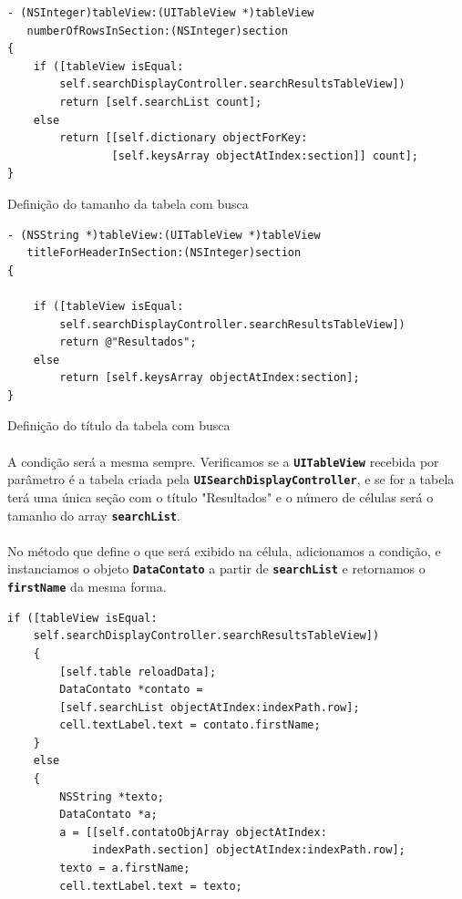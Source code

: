 \documentclass[a4paper,12pt,brazil,doubleside]{book}
\begin{document}
\begin{singlespace}
\bigskip

\begin{listing}[H]
\begin{verbatim}
- (NSInteger)tableView:(UITableView *)tableView
   numberOfRowsInSection:(NSInteger)section
{
    if ([tableView isEqual:
        self.searchDisplayController.searchResultsTableView])
        return [self.searchList count];
    else
        return [[self.dictionary objectForKey:
                [self.keysArray objectAtIndex:section]] count];
}
\end{verbatim}
\caption{Definição do tamanho da tabela com busca}
\end{listing}

\bigskip

\begin{listing}[H]
\begin{verbatim}
- (NSString *)tableView:(UITableView *)tableView
   titleForHeaderInSection:(NSInteger)section
{
    
    if ([tableView isEqual:
        self.searchDisplayController.searchResultsTableView])
        return @"Resultados";
    else
        return [self.keysArray objectAtIndex:section];
}
\end{verbatim}
\caption{Definição do título da tabela com busca}
\end{listing}

\paragraph{}A condição será a mesma sempre. Verificamos se a \texttt{\textbf{UITableView}} recebida por parâmetro é a tabela criada pela \texttt{\textbf{UISearchDisplayController}}, e se for a tabela terá uma única seção com o título "Resultados" e o número de células será o tamanho do array \texttt{\textbf{searchList}}.
\paragraph{}No método que define o que será exibido na célula, adicionamos a condição, e instanciamos o objeto \texttt{\textbf{DataContato}} a partir de \texttt{\textbf{searchList}} e retornamos o \texttt{\textbf{firstName}} da mesma forma.

\begin{listing}[H]
\begin{verbatim}
if ([tableView isEqual:
    self.searchDisplayController.searchResultsTableView])
    {
        [self.table reloadData];
        DataContato *contato =
        [self.searchList objectAtIndex:indexPath.row];
        cell.textLabel.text = contato.firstName;
    }
    else
    {
        NSString *texto;
        DataContato *a;
        a = [[self.contatoObjArray objectAtIndex:
             indexPath.section] objectAtIndex:indexPath.row];
        texto = a.firstName;
        cell.textLabel.text = texto;
        

\end{verbatim}
\end{listing}
\end{singlespace}
\end{document}
